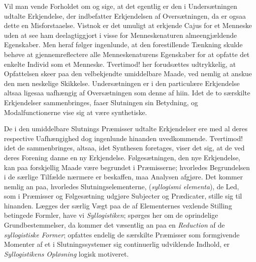\documentclass[12pt]{book}
\newcommand{\opage}[1]{\marginnote{\footnotesize\textit{[#1]}}}
\begin{document}
Vil man vende Forholdet om og sige, at det egentlig er den i Undersætningen udtalte Erkjendelse, der indbefatter Erkjendelsen af Oversætningen, da er ogsaa dette en Misforstaaelse. Vistnok er det umuligt at erkjende Cajus for et Menneske uden at see ham deelagtiggjort i visse for Menneskenaturen almeengjældende Egenskaber. Men heraf følger ingenlunde, at den forestillende Tænkning skulde behøve at gjennemreflectere alle Menneskenaturens Egenskaber for at opfatte det enkelte Individ som et Menneske. Tvertimod! her forudsættes udtrykkelig, at Opfattelsen skeer paa den velbekjendte umiddelbare Maade, ved nemlig at anskue den men%
\opage{315}neskelige Skikkelse. Undersætningen er i den particulære Erkjendelse altsaa ligesaa uafhængig af Oversætningen som denne af hiin. Idet de to særskilte Erkjendelser sammenbringes, faaer Slutningen sin Betydning, og Modalfunctionerne vise sig at være synthetiske.

De i den umiddelbare Slutnings Præmisser udtalte Erkjendelser ere med al deres respective Uafhængighed dog ingenlunde hinanden uvedkommende. Tvertimod! idet de sammenbringes, altsaa, idet Synthesen foretages, viser det sig, at de ved deres Forening danne en ny Erkjendelse. Følgesætningen, den nye Erkjendelse, kan paa forskjellig Maade være begrundet i Præmisserne; hvorledes Begrundelsen i de særlige Tilfælde nærmere er beskaffen, maa Analysen afgjøre. Det kommer nemlig an paa, hvorledes Slutningselementerne, (\textit{syllogismi elementa}),%
{} de Led, som i Præmisser og Følgesætning udgjøre Subjecter og Prædicater, stille sig til hinanden. Lægges der særlig Vægt paa de af Elementernes vexlende Stilling betingede Formler, have vi \emph{Syllogistiken}; spørges her om de oprindelige Grundbestemmelser, da kommer det væsentlig an paa en \emph{Reduction} af de \emph{syllogistiske Former}; opfattes endelig de særskilte Præmisser som formgivende Momenter af et i Slutningssystemer sig continuerlig udviklende Indhold, er \emph{Syllogistikens Opløsning} logisk motiveret.
\end{document}
